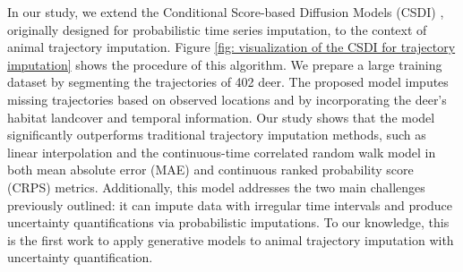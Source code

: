 \documentclass[11pt]{article}
\begin{document}
In our study, we extend the Conditional Score-based Diffusion Models (CSDI) \citep{tashiro2021csdi}, originally designed for probabilistic time series imputation, to the context of animal trajectory imputation. Figure \ref{fig: visualization of the CSDI for trajectory imputation} shows the procedure of this algorithm. We prepare a large training dataset by segmenting the trajectories of 402 deer. The proposed model imputes missing trajectories based on observed locations and by incorporating the deer's habitat landcover and temporal information. Our study shows that the model significantly outperforms traditional trajectory imputation methods, such as linear interpolation and the continuous-time correlated random walk model \citep{johnson2008continuous} in both mean absolute error (MAE) and continuous ranked probability score (CRPS) metrics. Additionally, this model addresses the two main challenges previously outlined: it can impute data with irregular time intervals and produce uncertainty quantifications via probabilistic imputations. To our knowledge, this is the first work to apply generative models to animal trajectory imputation with uncertainty quantification.
 
\end{document}
